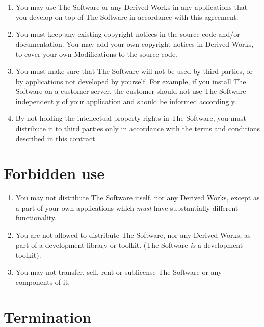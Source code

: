 \documentclass[a4paper,10pt]{article}
\begin{document}
\begin{enumerate}

  \item You may use The Software or any Derived Works in any applications that
    you develop on top of The Software in accordance with this agreement.

  \item You must keep any existing copyright notices in the source code and/or
    documentation.  You may add your own copyright notices in Derived Works, to
    cover your own Modifications to the source code.

  \item You must make sure that The Software will not be used by third parties,
    or by applications not developed by yourself.  For example, if you install
    The Software on a customer server, the customer should not use The Software
    independently of your application and should be informed accordingly.

  \item By not holding the intellectual property rights in The Software, you
    must distribute it to third parties only in accordance with the terms and
    conditions described in this contract.

\end{enumerate}

\section{Forbidden use}\label{sec:6}

\begin{enumerate}

  \item You may not distribute The Software itself, nor any Derived Works,
    except as a part of your own applications which \emph{must} have
    substantially different functionality.

  \item You are not allowed to distribute The Software, nor any Derived Works,
    as part of a development library or toolkit.  (The Software \emph{is} a
    development toolkit).

  \item You may not transfer, sell, rent or sublicense The Software or any
    components of it.

\end{enumerate}

\section{Termination}
\end{document}
